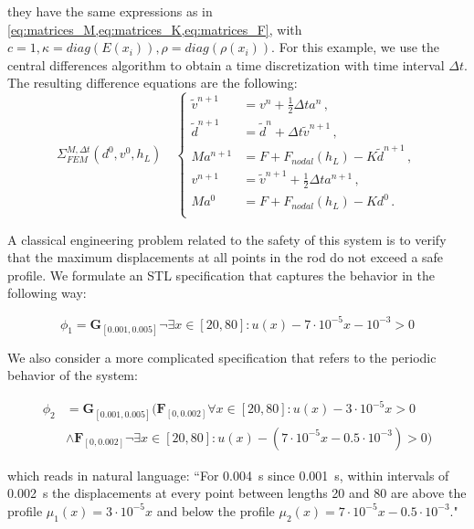 \documentclass[letterpaper, 10 pt, conference]{ieeeconf/ieeeconf}
\newcommand{\Always}{\mathbf{G}}
\newcommand{\Event}{\mathbf{F}}
\begin{document}
they have the same expressions as in
\cref{eq:matrices_M,eq:matrices_K,eq:matrices_F}, with $c = 1, \kappa =
diag(E(x_i)), \rho = diag(\rho(x_i))$.
For this example, we use the central differences algorithm to obtain a time
discretization with time interval $\Delta t$. The resulting difference equations
are the following:
%
\begin{equation}
    \Sigma^{M, \Delta t}_{FEM}(d^0, v^0, h_L) \quad \left \{
    \begin{aligned}
        \tilde v^{n+1} &= v^n + \frac{1}{2} \Delta t a^n \,, \\
        \tilde d^{n+1} &= \tilde d^{n} + \Delta t \tilde v^{n+1} \,, \\
        M a^{n+1} &= F + F_{nodal}(h_L) - K \tilde d^{n+1} \,, \\
        v^{n+1} &= \tilde v^{n+1} + \frac{1}{2} \Delta t a^{n+1} \,, \\
        M a^0 &= F + F_{nodal}(h_L) - K d^0 \,. \\
    \end{aligned}
    \right.
\end{equation}

A classical engineering problem related to the safety of this system is to
verify that the maximum displacements at all points in the rod do not exceed a
safe profile. We formulate an STL specification that captures the behavior in
the following way:

\begin{equation}
    \phi_1 = \Always_{[0.001, 0.005]} \lnot \exists x \in [20, 80]: u(x) - 7 \cdot
    10^{-5} x - 10^{-3} > 0
\end{equation}

We also consider a more complicated specification that refers to the periodic
behavior of the system:

\begin{equation}
\begin{aligned}
    \phi_2 &= \Always_{[0.001, 0.005]} \bigl( \Event_{[0, 0.002]} \forall x \in [20,
    80]: u(x) - 3 \cdot 10^{-5} x > 0 \\
    &\land \Event_{[0, 0.002]} \lnot \exists x
    \in [20, 80]: u(x) - (7 \cdot 10^{-5}x - 0.5 \cdot 10^{-3}) > 0\bigr)
\end{aligned}
\end{equation}

which reads in natural language: ``For \SI{0.004}{\second} since
\SI{0.001}{\second}, within intervals of \SI{0.002}{\second} the displacements
at every point between lengths \SI{20}{} and \SI{80}{} are above the profile
$\mu_1(x) = 3 \cdot 10^{-5} x$ and below the profile $\mu_2(x) = 7 \cdot 10^{-5} x
- 0.5 \cdot 10^{-3}$."
\end{document}
